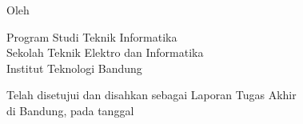 \clearpage
\pagestyle{empty}

\begin{center}
    \smallskip

    \Large \bfseries \MakeUppercase{\thetitle}
    \vfill

    \subtitle
    \vfill

    \large Oleh

    \Large \theauthor

    \large Program Studi Teknik Informatika \\

    \normalsize \normalfont
    Sekolah Teknik Elektro dan Informatika \\
    Institut Teknologi Bandung

    \thedate
    \vfill
    Telah disetujui dan disahkan sebagai Laporan Tugas Akhir \\
    di Bandung, pada tanggal \thedate

    \advisorapproval

\end{center}
\clearpage
